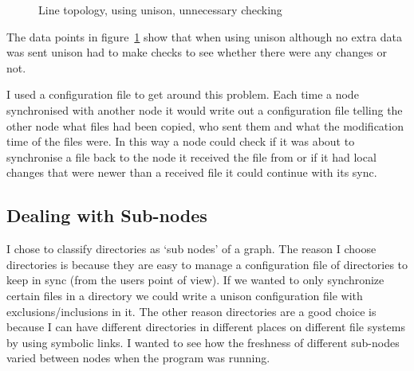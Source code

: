 \documentclass[12pt]{article}
\begin{document}
\begin{figure}[htp]
    \caption{Line topology, using unison, unnecessary checking}
    \label{fig:line_uni_tail_graph}
\end{figure}

The data points in figure~\ref{fig:line_uni_tail_graph} show that when using
unison although no extra data was sent unison had to make checks to see
whether there were any changes or not.

I used a configuration file to get around this problem. Each time a node
synchronised with another node it would write out a configuration file telling
the other node what files had been copied, who sent them and what the
modification time of the files were. In this way a node could check
if it was about to synchronise a file back to the node it received
the file from or if it had local changes that were newer than a received
file it could continue with its sync.

\subsection{Dealing with Sub-nodes}
\label{sec:subnodes}
I chose to classify directories as `sub nodes' of a graph. The reason I choose
directories is because they are easy to manage a configuration file of directories to
keep in sync (from the users point of view). If we wanted to only synchronize
certain files in a directory we could write a unison configuration file with 
exclusions/inclusions in it. The other reason directories are a good choice
is because I can have different directories in different places on different
file systems by using symbolic links. I wanted to see how the freshness of different
sub-nodes varied between nodes when the program was running.
\end{document}
